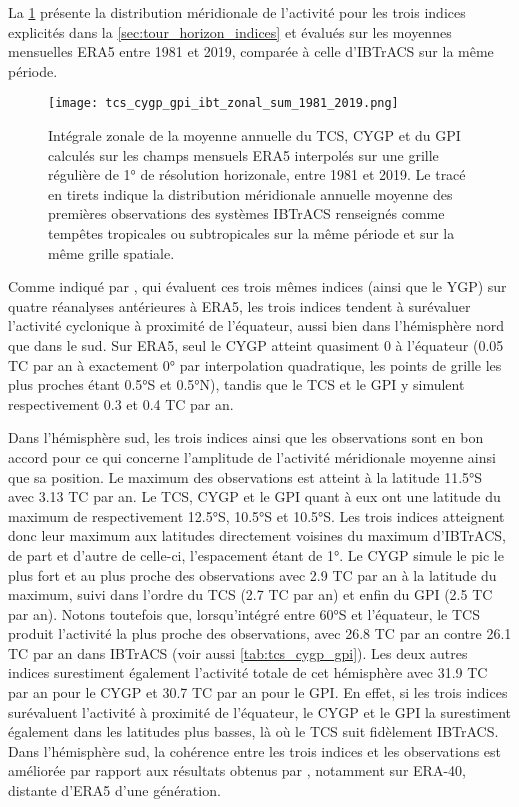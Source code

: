 \documentclass[../main.tex]{subfiles}
\begin{document}
La \cref{fig:tcs_cygp_gpi_zonal} présente la distribution méridionale de l'activité pour les trois indices explicités dans la \cref{sec:tour_horizon_indices} et
évalués sur les moyennes mensuelles ERA5 entre \num{1981} et \num{2019}, comparée à celle d'IBTrACS sur la même période. 
%
\begin{figure}[htb]
    \centering
    \texttt{[image: tcs\_cygp\_gpi\_ibt\_zonal\_sum\_1981\_2019.png]}
    \caption{Intégrale zonale de la moyenne annuelle du TCS, CYGP et du GPI calculés sur les champs mensuels ERA5 interpolés sur une grille régulière de 1° de
    résolution horizonale, entre 1981 et 2019. Le tracé en tirets indique la distribution méridionale annuelle moyenne des premières observations des systèmes
    IBTrACS renseignés comme tempêtes tropicales ou subtropicales sur la même période et sur la même grille spatiale.}
    \label{fig:tcs_cygp_gpi_zonal}
\end{figure}
%
Comme indiqué par \textcite{menkes_comparison_2012}, qui évaluent ces trois mêmes indices (ainsi que le YGP) sur quatre réanalyses antérieures à ERA5, les trois
indices tendent à surévaluer l'activité cyclonique à proximité de l'équateur, aussi bien dans l'hémisphère nord que dans le sud. Sur ERA5, seul le CYGP atteint
quasiment 0 à l'équateur (\num{0.05} TC par an à exactement 0° par interpolation quadratique, les points de grille les plus proches étant \ang{0.5}S et
\ang{0.5}N), tandis que le TCS et le GPI y simulent respectivement \num{0.3} et \num{0.4} TC par an.

Dans l'hémisphère sud, les trois indices ainsi que les
observations sont en bon accord pour ce qui concerne l'amplitude de l'activité méridionale moyenne ainsi que sa position. Le maximum des observations est
atteint à la latitude \ang{11.5}S avec \num{3.13} TC par an. Le TCS, CYGP et le GPI quant à eux ont une latitude du maximum de respectivement \ang{12.5}S,
\ang{10.5}S et \ang{10.5}S. Les trois indices atteignent donc leur maximum aux latitudes directement voisines du maximum d'IBTrACS, de part et d'autre de
celle-ci, l'espacement étant de \ang{1}. Le CYGP simule le pic le plus fort et au plus proche des observations avec \num{2.9} TC par an à la latitude du
maximum, suivi dans l'ordre du TCS (\num{2.7} TC par an) et enfin du GPI (\num{2.5} TC par an). Notons toutefois que, lorsqu'intégré entre \ang{60}S et
l'équateur, le TCS produit l'activité la plus proche des observations, avec \num{26.8} TC par an contre \num{26.1} TC par an dans IBTrACS (voir aussi
\cref{tab:tcs_cygp_gpi}). Les deux autres indices surestiment également l'activité totale de cet hémisphère avec \num{31.9} TC par an pour le CYGP et \num{30.7}
TC par an pour le GPI. En effet, si les trois indices surévaluent l'activité à proximité de l'équateur, le CYGP et le GPI la surestiment également dans les
latitudes plus basses, là où le TCS suit fidèlement IBTrACS. Dans l'hémisphère sud, la cohérence entre les trois indices et les observations est améliorée par
rapport aux résultats obtenus par \textcite{menkes_comparison_2012}, notamment sur ERA-40, distante d'ERA5 d'une génération.
\end{document}
